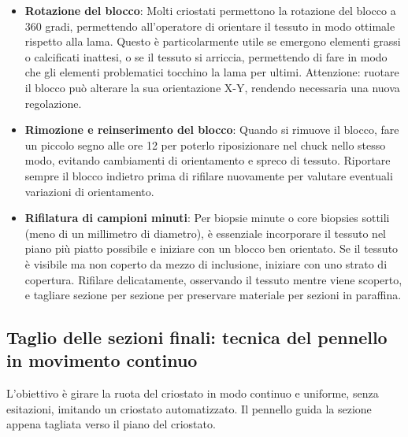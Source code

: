 \begin{itemize}
\item \textbf{Rotazione del blocco}: Molti criostati permettono la rotazione del blocco a 360 gradi, permettendo all'operatore di orientare il tessuto in modo ottimale rispetto alla lama. Questo è particolarmente utile se emergono elementi grassi o calcificati inattesi, o se il tessuto si arriccia, permettendo di fare in modo che gli elementi problematici tocchino la lama per ultimi. Attenzione: ruotare il blocco può alterare la sua orientazione X-Y, rendendo necessaria una nuova regolazione.

\item \textbf{Rimozione e reinserimento del blocco}: Quando si rimuove il blocco, fare un piccolo segno alle ore 12 per poterlo riposizionare nel chuck nello stesso modo, evitando cambiamenti di orientamento e spreco di tessuto. Riportare sempre il blocco indietro prima di rifilare nuovamente per valutare eventuali variazioni di orientamento.

\item \textbf{Rifilatura di campioni minuti}: Per biopsie minute o core biopsies sottili (meno di un millimetro di diametro), è essenziale incorporare il tessuto nel piano più piatto possibile e iniziare con un blocco ben orientato. Se il tessuto è visibile ma non coperto da mezzo di inclusione, iniziare con uno strato di copertura. Rifilare delicatamente, osservando il tessuto mentre viene scoperto, e tagliare sezione per sezione per preservare materiale per sezioni in paraffina. 


\end{itemize}

\subsection{Taglio delle sezioni finali: tecnica del pennello in movimento continuo}

L'obiettivo è girare la ruota del criostato in modo continuo e uniforme, senza esitazioni, imitando un criostato automatizzato. Il pennello guida la sezione appena tagliata verso il piano del criostato.

